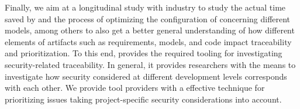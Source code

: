 Finally, we aim at a longitudinal study with industry to study the actual time saved by \appr{} and the process of optimizing the configuration of \appr{} concerning different models, among others to also get a better general understanding of how different elements of artifacts such as requirements, models, and code impact traceability and prioritization.
To this end, \appr{} provides the required tooling for investigating security-related traceability.
In general, it provides researchers with the means to investigate how security considered at different development levels corresponds with each other.
We provide tool providers with a effective technique for prioritizing issues taking project-specific security considerations into account.